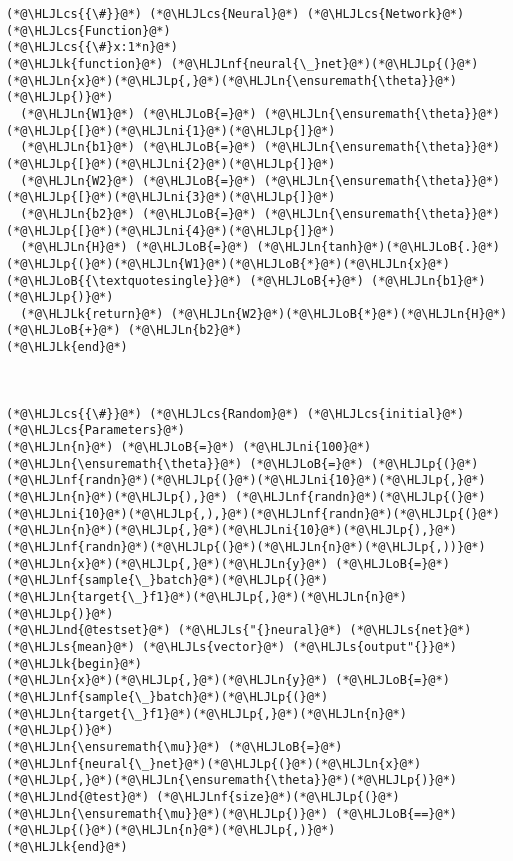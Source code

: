 \documentclass[12pt,a4paper]{article}
\newcommand{\HLJLk}[1]{\textcolor[RGB]{148,91,176}{\textbf{#1}}}
\newcommand{\HLJLn}[1]{#1}
\newcommand{\HLJLnd}[1]{\textcolor[RGB]{214,102,97}{#1}}
\newcommand{\HLJLnf}[1]{\textcolor[RGB]{66,102,213}{#1}}
\newcommand{\HLJLs}[1]{\textcolor[RGB]{201,61,57}{#1}}
\newcommand{\HLJLni}[1]{\textcolor[RGB]{59,151,46}{#1}}
\newcommand{\HLJLoB}[1]{\textcolor[RGB]{102,102,102}{\textbf{#1}}}
\newcommand{\HLJLp}[1]{#1}
\newcommand{\HLJLcs}[1]{\textcolor[RGB]{153,153,119}{\textit{#1}}}
\begin{document}
\begin{lstlisting}
(*@\HLJLcs{{\#}}@*) (*@\HLJLcs{Neural}@*) (*@\HLJLcs{Network}@*) (*@\HLJLcs{Function}@*)
(*@\HLJLcs{{\#}x:1*n}@*)
(*@\HLJLk{function}@*) (*@\HLJLnf{neural{\_}net}@*)(*@\HLJLp{(}@*)(*@\HLJLn{x}@*)(*@\HLJLp{,}@*)(*@\HLJLn{\ensuremath{\theta}}@*)(*@\HLJLp{)}@*)
  (*@\HLJLn{W1}@*) (*@\HLJLoB{=}@*) (*@\HLJLn{\ensuremath{\theta}}@*)(*@\HLJLp{[}@*)(*@\HLJLni{1}@*)(*@\HLJLp{]}@*)
  (*@\HLJLn{b1}@*) (*@\HLJLoB{=}@*) (*@\HLJLn{\ensuremath{\theta}}@*)(*@\HLJLp{[}@*)(*@\HLJLni{2}@*)(*@\HLJLp{]}@*)
  (*@\HLJLn{W2}@*) (*@\HLJLoB{=}@*) (*@\HLJLn{\ensuremath{\theta}}@*)(*@\HLJLp{[}@*)(*@\HLJLni{3}@*)(*@\HLJLp{]}@*)
  (*@\HLJLn{b2}@*) (*@\HLJLoB{=}@*) (*@\HLJLn{\ensuremath{\theta}}@*)(*@\HLJLp{[}@*)(*@\HLJLni{4}@*)(*@\HLJLp{]}@*)
  (*@\HLJLn{H}@*) (*@\HLJLoB{=}@*) (*@\HLJLn{tanh}@*)(*@\HLJLoB{.}@*)(*@\HLJLp{(}@*)(*@\HLJLn{W1}@*)(*@\HLJLoB{*}@*)(*@\HLJLn{x}@*)(*@\HLJLoB{{\textquotesingle}}@*) (*@\HLJLoB{+}@*) (*@\HLJLn{b1}@*)(*@\HLJLp{)}@*)
  (*@\HLJLk{return}@*) (*@\HLJLn{W2}@*)(*@\HLJLoB{*}@*)(*@\HLJLn{H}@*) (*@\HLJLoB{+}@*) (*@\HLJLn{b2}@*)
(*@\HLJLk{end}@*)



(*@\HLJLcs{{\#}}@*) (*@\HLJLcs{Random}@*) (*@\HLJLcs{initial}@*) (*@\HLJLcs{Parameters}@*)
(*@\HLJLn{n}@*) (*@\HLJLoB{=}@*) (*@\HLJLni{100}@*)
(*@\HLJLn{\ensuremath{\theta}}@*) (*@\HLJLoB{=}@*) (*@\HLJLp{(}@*)(*@\HLJLnf{randn}@*)(*@\HLJLp{(}@*)(*@\HLJLni{10}@*)(*@\HLJLp{,}@*)(*@\HLJLn{n}@*)(*@\HLJLp{),}@*) (*@\HLJLnf{randn}@*)(*@\HLJLp{(}@*)(*@\HLJLni{10}@*)(*@\HLJLp{,),}@*)(*@\HLJLnf{randn}@*)(*@\HLJLp{(}@*)(*@\HLJLn{n}@*)(*@\HLJLp{,}@*)(*@\HLJLni{10}@*)(*@\HLJLp{),}@*)(*@\HLJLnf{randn}@*)(*@\HLJLp{(}@*)(*@\HLJLn{n}@*)(*@\HLJLp{,))}@*)
(*@\HLJLn{x}@*)(*@\HLJLp{,}@*)(*@\HLJLn{y}@*) (*@\HLJLoB{=}@*) (*@\HLJLnf{sample{\_}batch}@*)(*@\HLJLp{(}@*)(*@\HLJLn{target{\_}f1}@*)(*@\HLJLp{,}@*)(*@\HLJLn{n}@*)(*@\HLJLp{)}@*)
(*@\HLJLnd{@testset}@*) (*@\HLJLs{"{}neural}@*) (*@\HLJLs{net}@*) (*@\HLJLs{mean}@*) (*@\HLJLs{vector}@*) (*@\HLJLs{output"{}}@*) (*@\HLJLk{begin}@*)
(*@\HLJLn{x}@*)(*@\HLJLp{,}@*)(*@\HLJLn{y}@*) (*@\HLJLoB{=}@*) (*@\HLJLnf{sample{\_}batch}@*)(*@\HLJLp{(}@*)(*@\HLJLn{target{\_}f1}@*)(*@\HLJLp{,}@*)(*@\HLJLn{n}@*)(*@\HLJLp{)}@*)
(*@\HLJLn{\ensuremath{\mu}}@*) (*@\HLJLoB{=}@*) (*@\HLJLnf{neural{\_}net}@*)(*@\HLJLp{(}@*)(*@\HLJLn{x}@*)(*@\HLJLp{,}@*)(*@\HLJLn{\ensuremath{\theta}}@*)(*@\HLJLp{)}@*)
(*@\HLJLnd{@test}@*) (*@\HLJLnf{size}@*)(*@\HLJLp{(}@*)(*@\HLJLn{\ensuremath{\mu}}@*)(*@\HLJLp{)}@*) (*@\HLJLoB{==}@*) (*@\HLJLp{(}@*)(*@\HLJLn{n}@*)(*@\HLJLp{,)}@*)
(*@\HLJLk{end}@*)
\end{lstlisting}
\end{document}
